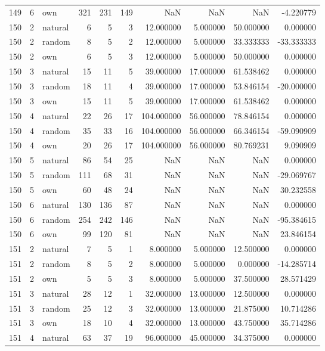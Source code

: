 \begin{table}[htbp]
\begin{tabular}{rrlrrrrrrr}
149 & 6 & own & 321 & 231 & 149 & NaN & NaN & NaN & -4.220779 \\
150 & 2 & natural & 6 & 5 & 3 & 12.000000 & 5.000000 & 50.000000 & 0.000000 \\
150 & 2 & random & 8 & 5 & 2 & 12.000000 & 5.000000 & 33.333333 & -33.333333 \\
150 & 2 & own & 6 & 5 & 3 & 12.000000 & 5.000000 & 50.000000 & 0.000000 \\
150 & 3 & natural & 15 & 11 & 5 & 39.000000 & 17.000000 & 61.538462 & 0.000000 \\
150 & 3 & random & 18 & 11 & 4 & 39.000000 & 17.000000 & 53.846154 & -20.000000 \\
150 & 3 & own & 15 & 11 & 5 & 39.000000 & 17.000000 & 61.538462 & 0.000000 \\
150 & 4 & natural & 22 & 26 & 17 & 104.000000 & 56.000000 & 78.846154 & 0.000000 \\
150 & 4 & random & 35 & 33 & 16 & 104.000000 & 56.000000 & 66.346154 & -59.090909 \\
150 & 4 & own & 20 & 26 & 17 & 104.000000 & 56.000000 & 80.769231 & 9.090909 \\
150 & 5 & natural & 86 & 54 & 25 & NaN & NaN & NaN & 0.000000 \\
150 & 5 & random & 111 & 68 & 31 & NaN & NaN & NaN & -29.069767 \\
150 & 5 & own & 60 & 48 & 24 & NaN & NaN & NaN & 30.232558 \\
150 & 6 & natural & 130 & 136 & 87 & NaN & NaN & NaN & 0.000000 \\
150 & 6 & random & 254 & 242 & 146 & NaN & NaN & NaN & -95.384615 \\
150 & 6 & own & 99 & 120 & 81 & NaN & NaN & NaN & 23.846154 \\
151 & 2 & natural & 7 & 5 & 1 & 8.000000 & 5.000000 & 12.500000 & 0.000000 \\
151 & 2 & random & 8 & 5 & 2 & 8.000000 & 5.000000 & 0.000000 & -14.285714 \\
151 & 2 & own & 5 & 5 & 3 & 8.000000 & 5.000000 & 37.500000 & 28.571429 \\
151 & 3 & natural & 28 & 12 & 1 & 32.000000 & 13.000000 & 12.500000 & 0.000000 \\
151 & 3 & random & 25 & 12 & 3 & 32.000000 & 13.000000 & 21.875000 & 10.714286 \\
151 & 3 & own & 18 & 10 & 4 & 32.000000 & 13.000000 & 43.750000 & 35.714286 \\
151 & 4 & natural & 63 & 37 & 19 & 96.000000 & 45.000000 & 34.375000 & 0.000000 \\

\end{tabular}
\end{table}
